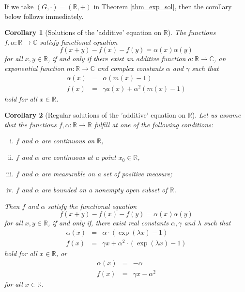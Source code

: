 \documentclass[a4paper,12pt]{article}
\theoremstyle{plain}
\newtheorem{cor}{Corollary}
\theoremstyle{definition}
\theoremstyle{remark}
\begin{document}
If we take $(G, \cdot)= (\mathbb{R}, +)$ in Theorem \ref{thm_exp_sol}, then the corollary below follows immediately. 

\begin{cor}[Solutions of the 'additive' equation on $\mathbb{R}$]
 The functions  $f, \alpha \colon \mathbb{R}\to \mathbb{C}$ satisfy functional equation
 \begin{equation}
  f(x+y)-f(x)-f(y)= \alpha(x)\alpha(y)
 \end{equation}
for all $x, y\in \mathbb{R}$, if and only if there exist an additive function $a\colon \mathbb{R}\to \mathbb{C}$, an exponential function $m\colon \mathbb{R}\to \mathbb{C}$ and complex constants 
 $\alpha$ and $\gamma$ such that 
 \begin{equation}
 \begin{array}{rcl}
 \alpha(x)&=& \alpha (m(x)-1)\\
  f(x)&=& \gamma  a(x)+\alpha^{2} (m(x)-1)
  \end{array}
   \end{equation}
 hold for all $x\in \mathbb{R}$. 
 \end{cor}



\begin{cor}[Regular solutions of the 'additive' equation on $\mathbb{R}$]\label{cor_add_reg}
 Let us assume that the functions $f, \alpha \colon \mathbb{R}\to \mathbb{R}$ fulfill at  one of the following conditions:
 \begin{enumerate}[(i)]
 \item $f$ and $\alpha$ are continuous on $\mathbb{R}$, 
 \item $f$ and $\alpha$ are continuous at a point $x_{0}\in \mathbb{R}$, 
 \item $f$ and $\alpha$ are measurable on a set of positive measure; 
 \item $f$ and $\alpha$ are bounded on a nonempty open subset of $\mathbb{R}$. 
\end{enumerate} 
Then $f$ and $\alpha$ satisfy the functional equation 
 \begin{equation}
  f(x+y)-f(x)-f(y)= \alpha(x) \alpha(y)
 \end{equation}
for all $x, y\in \mathbb{R}$, if and only if, 
there exist real constants $\alpha, \gamma$  and $\lambda$ such that 
  \[
 \begin{array}{rcl}
 \alpha(x)&=& \alpha \cdot (\exp(\lambda x )-1)\\
  f(x)&=& \gamma   x+\alpha^{2}\cdot (\exp(\lambda x )- 1)
  \end{array}
   \]
 hold for all $x\in \mathbb{R}$, or 
 \[
  \begin{array}{rcl}
 \alpha(x)&=& -\alpha\\
  f(x)&=& \gamma  x- \alpha^{2}
  \end{array}
  \]
for all $x\in \mathbb{R}$. 
\end{cor}
\end{document}

